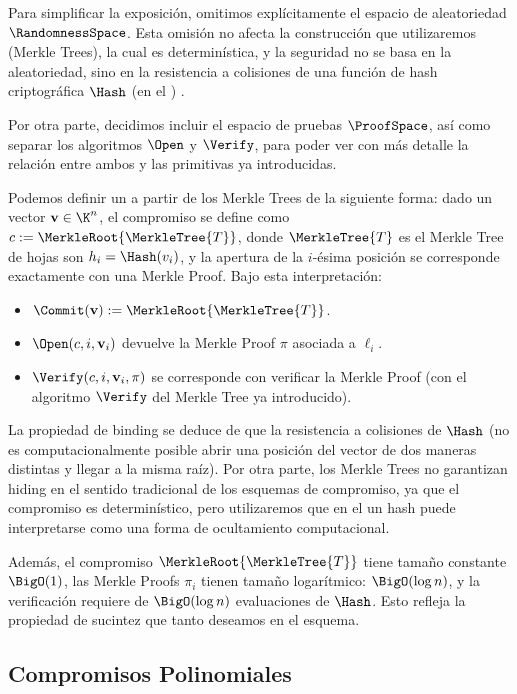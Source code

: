 Para simplificar la exposición, omitimos explícitamente el espacio de aleatoriedad $\RandomnessSpace$. Esta omisión no afecta la construcción que utilizaremos (Merkle Trees), la cual es determinística, y la seguridad no se basa en la aleatoriedad, sino en la resistencia a colisiones de una función de hash criptográfica $\Hash$ (en el \ROM) \cite{katz}.

Por otra parte, decidimos incluir el espacio de pruebas $\ProofSpace$, así como separar los algoritmos $\Open$ y $\Verify$, para poder ver con más detalle la relación entre ambos y las primitivas ya introducidas.

Podemos definir un \VCS a partir de los Merkle Trees de la siguiente forma: dado un vector $\mathbf{v} \in \K^n$, el compromiso se define como $c := \MerkleRoot{\MerkleTree{T}}$, donde $\MerkleTree{T}$ es el Merkle Tree de hojas son $h_i = \Hash(v_i)$, y la apertura de la $i$-ésima posición se corresponde exactamente con una Merkle Proof. Bajo esta interpretación:

\begin{itemize}[itemsep=0.1cm]
	\item $\Commit(\mathbf{v}) := \MerkleRoot{\MerkleTree{T}}$.
	\item $\Open(c,i, \mathbf{v}_i)$ devuelve la Merkle Proof $\pi$ asociada a $\ell_i$.
	\item $\Verify(c, i, \mathbf{v}_i, \pi)$ se corresponde con verificar la Merkle Proof (con el algoritmo $\Verify$ del Merkle Tree ya introducido).
\end{itemize}

La propiedad de binding se deduce de que la resistencia a colisiones de $\Hash$ (no es computacionalmente posible abrir una posición del vector de dos maneras distintas y llegar a la misma raíz). Por otra parte, los Merkle Trees no garantizan hiding en el sentido tradicional de los esquemas de compromiso, ya que el compromiso es determinístico, pero utilizaremos que en el \ROM un hash puede interpretarse como una forma de ocultamiento computacional.

Además, el compromiso $\MerkleRoot{\MerkleTree{T}}$ tiene tamaño constante $\BigO(1)$, las Merkle Proofs $\pi_i$ tienen tamaño logarítmico: $\BigO(\log n)$, y la verificación requiere de $\BigO(\log n)$ evaluaciones de $\Hash$. Esto refleja la propiedad de sucintez que tanto deseamos en el esquema.

\subsection{Compromisos Polinomiales}

